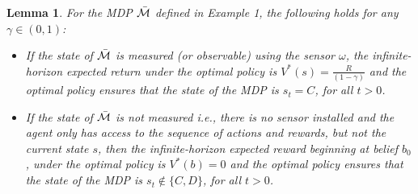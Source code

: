 \documentclass[twocolumn]{autart}    %
\newtheorem{lemma}{Lemma}
\begin{document}
 \begin{lemma}
 \label{lma1}
For the MDP $\Bar{\mathcal{M}}$ defined in Example 1, the following holds for any $\gamma\in (0,1)$:
\begin{itemize}
    \item [(i)] If the state of  $\Bar{\mathcal{M}}$ is measured (or observable) using the sensor $\omega$, the infinite-horizon expected return under the optimal policy is $V^*(s) = \frac{R}{(1-\gamma)}$ and the optimal policy ensures that the state of the MDP is $s_t=C$, for all $t>0$. 
    \item[(ii)] If the state of $\Bar{\mathcal{M}}$ is not measured i.e., there is no sensor installed and the agent only has access to the sequence of actions and rewards, but not the current state $s$, then the infinite-horizon expected reward beginning at belief $b_0$, under the optimal policy is $V^*(b) = 0$ and the optimal policy ensures that the state of the MDP is $s_t\notin  \{C,D\}$, for all $t>0$. 
\end{itemize}
\end{lemma} 





\end{document}
